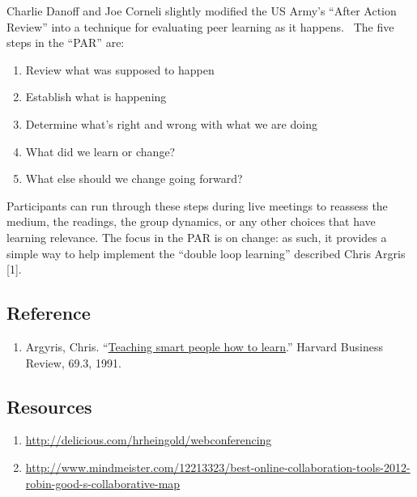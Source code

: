 Charlie Danoff and Joe Corneli slightly modified the US Army's ``After
Action Review'' into a technique for evaluating peer learning as it
happens.~ The five steps in the ``PAR'' are:

\begin{enumerate}
\def\labelenumi{\arabic{enumi}.}
\item
  Review what was supposed to happen
\item
  Establish what is happening
\item
  Determine what's right and wrong with what we are doing
\item
  What did we learn or change?
\item
  What else should we change going forward?
\end{enumerate}

Participants can run through these steps during live meetings to
reassess the medium, the readings, the group dynamics, or any other
choices that have learning relevance. The focus in the PAR is on change:
as such, it provides a simple way to help implement the ``double loop
learning'' described Chris Argris {{[}1{]}}.

\hypertarget{reference}{%
\subsection{Reference}\label{reference}}

\begin{enumerate}
\def\labelenumi{\arabic{enumi}.}
\tightlist
\item
  Argyris, Chris.
  ``\href{http://pds8.egloos.com/pds/200805/20/87/chris_argyris_learning.pdf}{Teaching
  smart people how to learn}.'' Harvard Business Review, 69.3, 1991.
\end{enumerate}

\hypertarget{resources}{%
\subsection{Resources}\label{resources}}

\begin{enumerate}
\def\labelenumi{\arabic{enumi}.}
\item
  {\url{http://delicious.com/hrheingold/webconferencing}}
\item
  {\url{http://www.mindmeister.com/12213323/best-online-collaboration-tools-2012-robin-good-s-collaborative-map}}
\end{enumerate}
